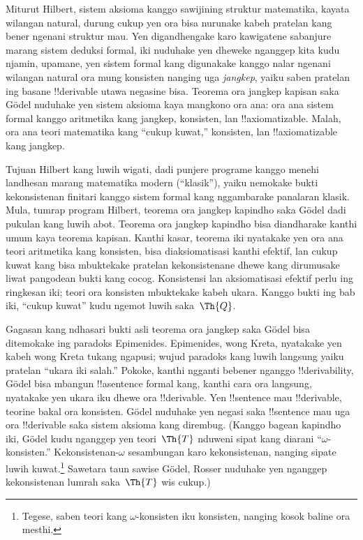 \documentclass[../../../include/open-logic-section]{subfiles}
\begin{document}


Miturut Hilbert, sistem aksioma kanggo sawijining struktur matematika,
kayata wilangan natural, durung cukup yen ora bisa nurunake kabeh pratelan
kang bener ngenani struktur mau. Yen digandhengake karo kawigatene
sabanjure marang sistem deduksi formal, iki nuduhake yen dheweke nganggep
kita kudu njamin, upamane, yen sistem formal kang digunakake kanggo
nalar ngenani wilangan natural ora mung konsisten nanging uga
\emph{jangkep}, yaiku saben pratelan ing basane !!{derivable} utawa negasine bisa. Teorema ora jangkep kapisan saka
G\"odel nuduhake yen sistem aksioma kaya mangkono ora ana: ora ana
sistem formal kanggo aritmetika kang jangkep, konsisten, lan
!!{axiomatizable}. Malah, ora ana teori matematika kang
``cukup kuwat,'' konsisten, lan !!{axiomatizable} kang jangkep.

Tujuan Hilbert kang luwih wigati, dadi punjere programe kanggo
menehi landhesan marang matematika modern (``klasik''), yaiku nemokake bukti
kekonsistenan finitari kanggo sistem formal kang nggambarake panalaran
klasik. Mula, tumrap program Hilbert, teorema ora jangkep kapindho saka
G\"odel dadi pukulan kang luwih abot. Teorema ora jangkep kapindho bisa
diandharake kanthi umum kaya teorema kapisan. Kanthi kasar, teorema iki
nyatakake yen ora ana teori aritmetika kang konsisten, bisa diaksiomatisasi kanthi efektif, lan cukup kuwat kang bisa
mbuktekake pratelan kekonsistenane dhewe kang dirumusake liwat pangodean bukti kang cocog. Konsistensi lan aksiomatisasi efektif perlu ing ringkesan iki; teori ora konsisten mbuktekake kabeh ukara. Kanggo bukti ing bab iki, ``cukup kuwat'' kudu
ngemot luwih saka~$\Th{Q}$.

Gagasan kang ndhasari bukti asli teorema ora jangkep saka G\"odel
bisa ditemokake ing paradoks Epimenides. Epimenides, wong Kreta,
nyatakake yen kabeh wong Kreta tukang ngapusi; wujud paradoks kang
luwih langsung yaiku pratelan ``ukara iki salah.'' Pokoke, kanthi
ngganti bebener nganggo !!{derivability}, G\"odel bisa mbangun
!!a{sentence} formal kang, kanthi cara ora langsung, nyatakake yen
ukara iku dhewe ora !!{derivable}. Yen !!{sentence} mau !!{derivable},
teorine bakal ora konsisten. G\"odel nuduhake yen negasi saka
!!{sentence} mau uga ora !!{derivable} saka sistem aksioma kang
dirembug. (Kanggo bagean kapindho iki, G\"odel kudu nganggep yen
teori~$\Th{T}$ nduweni sipat kang diarani ``$\omega$-konsisten.''
Kekonsistenan-$\omega$ sesambungan karo kekonsistenan, nanging sipate
luwih kuwat.\footnote{Tegese, saben teori kang $\omega$-konsisten iku
konsisten, nanging kosok baline ora mesthi.} Sawetara taun sawise
G\"odel, Rosser nuduhake yen nganggep kekonsistenan lumrah saka~$\Th{T}$
wis cukup.)
\end{document}
